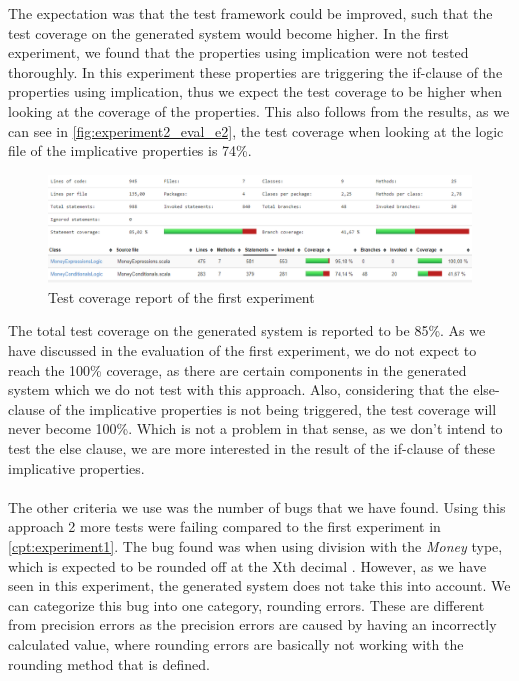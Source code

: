 The expectation was that the test framework could be improved, such that the test
coverage on the generated system would become higher. In the first experiment,
we found that the properties using implication were not tested thoroughly. In
this experiment these properties are triggering the if-clause of the properties
using implication, thus we expect the test coverage to be higher when looking at
the coverage of the properties. This also follows from the results, as we can
see in \autoref{fig:experiment2_eval_e2}, the test coverage when looking at the
logic file of the implicative properties is 74\%.
\FloatBarrier
\begin{figure}[!ht]
	\includegraphics[width=\linewidth]{figures/eval_experiment2}
\caption{Test coverage report of the first experiment}
\label{fig:experiment2_eval_e2}
\centering
\end{figure}
\FloatBarrier
The total test coverage on the generated system is reported to be 85\%. As we
have discussed in the evaluation of the first experiment, we do not expect to
reach the 100\% coverage, as there are certain components in the generated
system which we do not test with this approach. Also, considering that the
else-clause of the implicative properties is not being triggered, the test
coverage will never become 100\%. Which is not a problem in that sense, as we
don't intend to test the else clause, we are more interested in the result of
the if-clause of these implicative properties.\\
\\
The other criteria we use was the number of bugs that we have found. Using this
approach 2 more tests were failing compared to the first experiment in
\autoref{cpt:experiment1}. The bug found was when using division with the
\textit{Money} type, which is expected to be rounded off at the Xth decimal
. However, as we have seen in this experiment, the generated
system does not take this into account. We can categorize this bug into one
category, rounding errors. These are different from precision errors as the
precision errors are caused by having an incorrectly calculated value, where
rounding errors are basically not working with the rounding method that is
defined.

